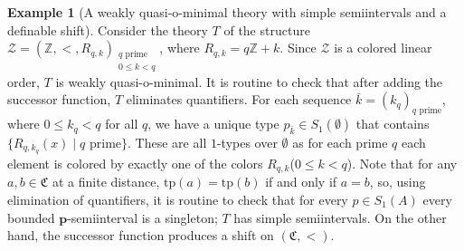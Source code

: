 \documentclass{amsart}
\theoremstyle{definition}
\theoremstyle{definition}
\newtheorem{Example}[Theorem]{Example}
\newcommand{\Mon}{\mathfrak C}
\newcommand{\tp}{\mathrm{tp}}
\begin{document}
\begin{Example}[A weakly quasi-o-minimal theory with simple semiintervals and a definable shift]\label{Example Z < many colors}
Consider the theory $T$ of the structure $\mathcal Z=(\mathbb Z,<,R_{q,k})_{\substack{q\text{ prime}\\0\leqslant k<q}}$, where $R_{q,k}= q\mathbb Z+k$. Since $\mathcal Z$ is a colored linear order, $T$ is weakly quasi-o-minimal. It is routine to check that after adding the successor function, $T$ eliminates quantifiers. For each sequence $\bar k= (k_q)_{q\text{ prime}}$, where $0\leqslant k_q<q$ for all $q$, we have a unique type $p_{\bar k}\in S_1(\emptyset)$ that contains $\{R_{q,k_q}(x)\mid q\text{ prime}\}$. These are all $1$-types over $\emptyset$ as for each prime $q$ each element is colored by exactly one of the colors $R_{q,k}$($0\leqslant k<q$). Note that for any $a,b\in\Mon$ at a finite distance, $\tp(a)=\tp(b)$ if and only if $a=b$, so, using elimination of quantifiers, it is routine to check that for every $p\in S_1(A)$ every bounded $\mathbf p$-semiinterval is a singleton; $T$ has simple semiintervals. On the other hand, the successor function produces a shift on $(\Mon,<)$. 
\end{Example}
\end{document}
